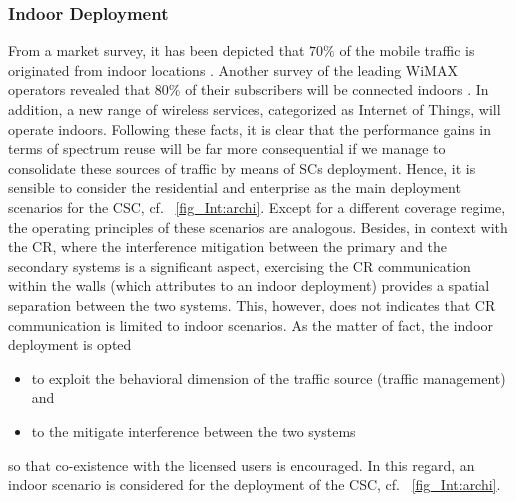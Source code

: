 \subsubsection*{Indoor Deployment}
From a market survey, it has been depicted that $70\%$ of the mobile traffic is originated from indoor locations \cite{Chander08}. Another survey of the leading WiMAX operators revealed that $80\%$ of their subscribers will be connected indoors \cite{Pao07}. In addition, a new range of wireless services, categorized as Internet of Things, will operate indoors. Following these facts, it is clear that the performance gains in terms of spectrum reuse will be far more consequential if we manage to consolidate these sources of traffic by means of SCs deployment. Hence, it is sensible to consider the residential and enterprise as the main deployment scenarios for the CSC, cf. \figurename~\ref{fig_Int:archi}. Except for a different coverage regime, the operating principles of these scenarios are analogous. Besides, in context with the CR, where the interference mitigation between the primary and the secondary systems is a significant aspect, exercising the CR communication within the walls (which attributes to an indoor deployment) provides a spatial separation between the two systems. This, however, does not indicates that CR communication is limited to indoor scenarios. As the matter of fact, the indoor deployment is opted \begin{itemize} \item to exploit the behavioral dimension of the traffic source (traffic management) and \item to the mitigate interference between the two systems \end{itemize} so that co-existence with the licensed users is encouraged. 
In this regard, an indoor scenario is considered for the deployment of the CSC, cf. \figurename~\ref{fig_Int:archi}.  

